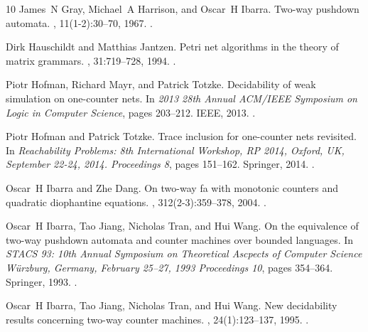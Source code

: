 \documentclass[11pt,a4paper]{amsart}
\theoremstyle{definition}
\begin{document}
\begin{thebibliography}{10}
James~N Gray, Michael~A Harrison, and Oscar~H Ibarra.
\newblock Two-way pushdown automata.
, 11(1-2):30--70, 1967.
\newblock \href {https://doi.org/10.1016/S0019-9958(67)90369-5}
  {}.

Dirk Hauschildt and Matthias Jantzen.
\newblock Petri net algorithms in the theory of matrix grammars.
, 31:719--728, 1994.
\newblock \href {https://doi.org/10.1007/BF01178731}
  {}.

Piotr Hofman, Richard Mayr, and Patrick Totzke.
\newblock Decidability of weak simulation on one-counter nets.
\newblock In {\em 2013 28th Annual ACM/IEEE Symposium on Logic in Computer
  Science}, pages 203--212. IEEE, 2013.
\newblock \href {https://doi.org/10.1109/LICS.2013.26}
  {}.

Piotr Hofman and Patrick Totzke.
\newblock Trace inclusion for one-counter nets revisited.
\newblock In {\em Reachability Problems: 8th International Workshop, RP 2014,
  Oxford, UK, September 22-24, 2014. Proceedings 8}, pages 151--162. Springer,
  2014.
\newblock \href {https://doi.org/10.1007/978-3-319-11439-2_12}
  {}.

Oscar~H Ibarra and Zhe Dang.
\newblock On two-way fa with monotonic counters and quadratic diophantine
  equations.
, 312(2-3):359--378, 2004.
\newblock \href {https://doi.org/10.1016/j.tcs.2003.10.027}
  {}.

Oscar~H Ibarra, Tao Jiang, Nicholas Tran, and Hui Wang.
\newblock On the equivalence of two-way pushdown automata and counter machines
  over bounded languages.
\newblock In {\em STACS 93: 10th Annual Symposium on Theoretical Ascpects of
  Computer Science W{\"u}rzburg, Germany, February 25--27, 1993 Proceedings
  10}, pages 354--364. Springer, 1993.
\newblock \href {https://doi.org/10.1007/3-540-56503-5_36}
  {}.

Oscar~H Ibarra, Tao Jiang, Nicholas Tran, and Hui Wang.
\newblock New decidability results concerning two-way counter machines.
, 24(1):123--137, 1995.
\newblock \href {https://doi.org/10.1137/S0097539792240625}
  {}.


\end{thebibliography}
\end{document}
